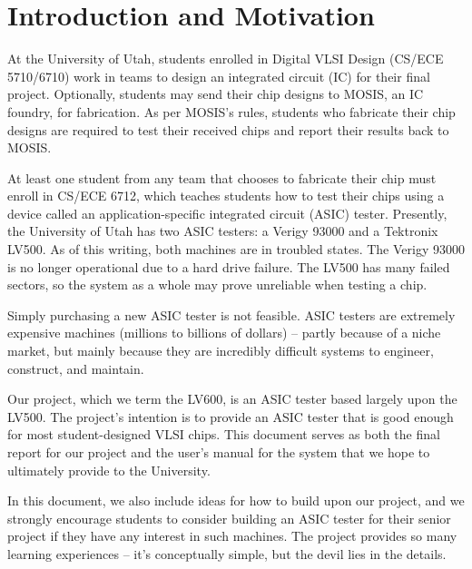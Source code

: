 \section{Introduction and Motivation}
At the University of Utah, students enrolled in Digital VLSI Design (CS/ECE 5710/6710) work in teams to design an integrated circuit (IC) for their final project. Optionally, students may send their chip designs to MOSIS, an IC foundry, for fabrication. As per MOSIS's rules, students who fabricate their chip designs are required to test their received chips and report their results back to MOSIS. 

At least one student from any team that chooses to fabricate their chip must enroll in CS/ECE 6712, which teaches students how to test their chips using a device called an application-specific integrated circuit (ASIC) tester. Presently, the University of Utah has two ASIC testers: a Verigy 93000 and a Tektronix LV500. As of this writing, both machines are in troubled states. The Verigy 93000 is no longer operational due to a hard drive failure. The LV500 has many failed sectors, so the system as a whole may prove unreliable when testing a chip. 

Simply purchasing a new ASIC tester is not feasible. ASIC testers are extremely expensive machines (millions to billions of dollars) --  partly because of a niche market, but mainly because they are incredibly difficult systems to engineer, construct, and maintain. 

Our project, which we term the LV600, is an ASIC tester based largely upon the LV500. The project's intention is to provide an ASIC tester that is good enough for most student-designed VLSI chips. This document serves as both the final report for our project and the user's manual for the system that we hope to ultimately provide to the University. 

In this document, we also include ideas for how to build upon our project, and we strongly encourage students to consider building an ASIC tester for their senior project if they have any interest in such machines. The project provides so many learning experiences -- it's conceptually simple, but the devil lies in the details. 

\newpage